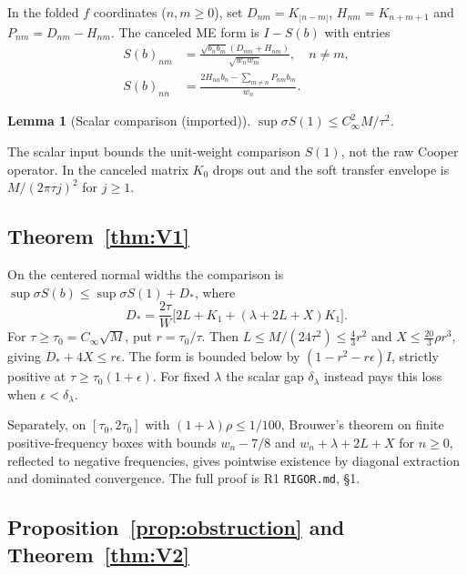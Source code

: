 \documentclass[11pt]{article}
\newcommand{\Cinf}{C_\infty}
\newtheorem{lemma}[theorem]{Lemma}
\theoremstyle{definition}
\theoremstyle{remark}
\begin{document}
In the folded $f$ coordinates ($n,m\ge0$), set $D_{nm}=K_{|n-m|}$, $H_{nm}=K_{n+m+1}$ and $P_{nm}=D_{nm}-H_{nm}$. The canceled ME form is $I-S(b)$ with entries
\begin{align*}
 S(b)_{nm}&=\frac{\sqrt{b_nb_m}(D_{nm}+H_{nm})}{\sqrt{w_nw_m}},\quad n\ne m,\\
 S(b)_{nn}&=\frac{2H_{nn}b_n-\sum_{m\ne n}P_{nm}b_m}{w_n}.
\end{align*}

\begin{lemma}[Scalar comparison (imported)]\label{lem:import}
$\sup\sigma S(1)\le\Cinf^2M/\tau^2$.
\end{lemma}

\noindent The scalar input \cite{RensScalar} bounds the unit-weight comparison $S(1)$, not the raw Cooper operator. In the canceled matrix $K_0$ drops out and the soft transfer envelope is $M/(2\pi\tau j)^2$ for $j\ge1$.

\subsection{Theorem~\ref{thm:V1}}

On the centered normal widths the comparison is $\sup\sigma S(b)\le\sup\sigma S(1)+D_*$, where
\[
D_*=\frac{2\tau}{W}\big[2L+K_1+(\lambda+2L+X)K_1\big].
\]
For $\tau\ge\tau_0=\Cinf\sqrt M$, put $r=\tau_0/\tau$. Then $L\le M/(24\tau^2)\le\tfrac43r^2$ and $X\le\tfrac{20}{3}\rho r^3$, giving $D_*+4X\le r\epsilon$. The form is bounded below by $(1-r^2-r\epsilon)I$, strictly positive at $\tau\ge\tau_0(1+\epsilon)$. For fixed $\lambda$ the scalar gap $\delta_\lambda$ instead pays this loss when $\epsilon<\delta_\lambda$.

Separately, on $[\tau_0,2\tau_0]$ with $(1+\lambda)\rho\le1/100$, Brouwer's theorem on finite positive-frequency boxes with bounds $w_n-7/8$ and $w_n+\lambda+2L+X$ for $n\ge0$, reflected to negative frequencies, gives pointwise existence by diagonal extraction and dominated convergence. The full proof is R1 \texttt{RIGOR.md}, \S1.

\subsection{Proposition~\ref{prop:obstruction} and Theorem~\ref{thm:V2}}
\end{document}
